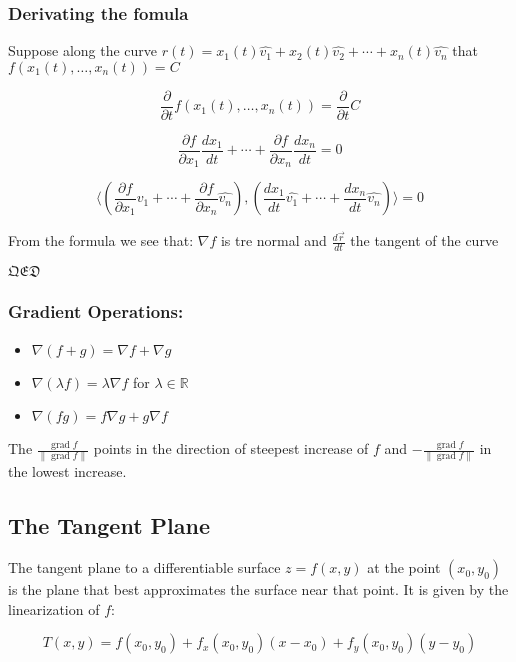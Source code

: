 \subsubsection{Derivating the fomula}

Suppose along the curve \(r(t) = x_1(t)\hat{v_1} + x_2(t)\hat{v_2} + \cdots + x_n(t)\hat{v_n}\) that \(f(x_1(t), \dots, x_n(t)) = C\)

\[
\frac{\partial}{\partial t}f(x_1(t), \dots, x_n(t)) = \frac{\partial}{\partial t}C
\]

\[
\frac{\partial f}{\partial x_1}\frac{dx_1}{dt} + \cdots + \frac{\partial f}{\partial x_n}\frac{dx_n}{dt} = 0
\]

\[
\langle \left(\frac{\partial f}{\partial x_1}\hat{v_1} + \cdots + \frac{\partial f}{\partial x_n}\hat{v_n}\right) , \left( \frac{dx_1}{dt}\hat{v_1} + \cdots + \frac{dx_n}{dt}\hat{v_n}\right)\rangle = 0
\]

From the formula we see that: \(\nabla f\) is tre normal and \(\frac{d\vec{r}}{dt}\) the tangent of the curve

\(\mathfrak{QED}\)
\subsubsection{Gradient Operations:}
\begin{itemize}[label=\(-\)]
\item \( \nabla(f + g) = \nabla f + \nabla g \)
\item \( \nabla(\lambda f) = \lambda \nabla f \) for \( \lambda \in \mathbb{R} \)
\item \( \nabla(fg) = f \nabla g + g \nabla f \)
\end{itemize}

The \(\frac{\operatorname{grad}f}{\|\operatorname{grad}f\|}\) points in the direction of steepest increase of \( f \) and
 \(- \frac{\operatorname{grad}f}{\|\operatorname{grad}f\|}\) in the lowest increase.



\subsection{The Tangent Plane}

The tangent plane to a differentiable surface \( z = f(x, y) \) at the point \( (x_0, y_0) \) is the plane that best approximates the surface near that point. It is given by the linearization of \( f \):

\[
T(x, y) = f(x_0, y_0) + f_x(x_0, y_0)(x - x_0) + f_y(x_0, y_0)(y - y_0)
\]

